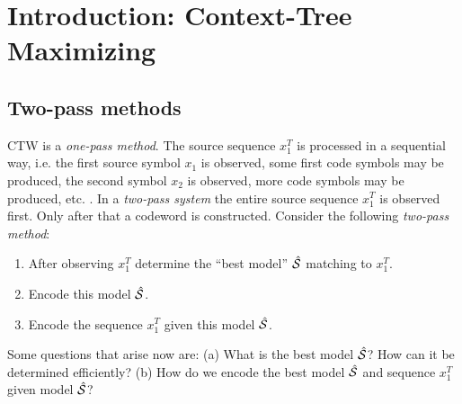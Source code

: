 \documentclass[10pt,conference]{IEEEtran}
\newcommand{\xT}{x^{T}_{1}}
\newcommand{\hcS}{{\hat{\cal{S}}}}
\begin{document}
\section{Introduction: Context-Tree Maximizing}\label{sec:maximizing}
\subsection{Two-pass methods}
CTW is a {\em one-pass method}.
The source sequence $\xT$ is processed in a sequential way, i.e. the first source symbol $x_1$ is observed, some first code symbols may be produced, the second symbol $x_2$ is observed, more code symbols may be produced, etc. .
In a {\em two-pass system} the entire source sequence $\xT$ is observed first.
Only after that a codeword is constructed.
Consider the following {\em two-pass method}:
\begin{enumerate}
\item
After observing $\xT$ determine the ``best model'' $\hcS$ matching to $\xT$.
\item
Encode this model $\hcS$.
\item
Encode the sequence $\xT$ given this model $\hcS$.
\end{enumerate}
Some questions that arise now are:
(a) What is the best model $\hcS$?
How can it be determined efficiently?
(b) How do we encode the best model $\hcS$ and sequence $\xT$ given model $\hcS$?

\end{document}
